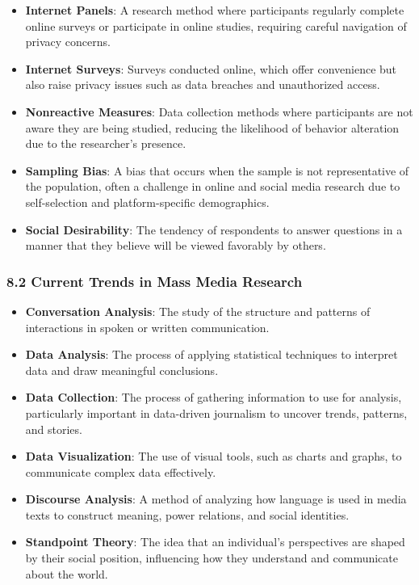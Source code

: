 \documentclass[
]{book}
\providecommand{\tightlist}{%
  \setlength{\itemsep}{0pt}\setlength{\parskip}{0pt}}
\begin{document}
\begin{itemize}
\tightlist
\item
  \textbf{Internet Panels}: A research method where participants regularly complete online surveys or participate in online studies, requiring careful navigation of privacy concerns.
\item
  \textbf{Internet Surveys}: Surveys conducted online, which offer convenience but also raise privacy issues such as data breaches and unauthorized access.
\item
  \textbf{Nonreactive Measures}: Data collection methods where participants are not aware they are being studied, reducing the likelihood of behavior alteration due to the researcher's presence.
\item
  \textbf{Sampling Bias}: A bias that occurs when the sample is not representative of the population, often a challenge in online and social media research due to self-selection and platform-specific demographics.
\item
  \textbf{Social Desirability}: The tendency of respondents to answer questions in a manner that they believe will be viewed favorably by others.
\end{itemize}

\subsubsection*{\texorpdfstring{\textbf{8.2 Current Trends in Mass Media Research}}{8.2 Current Trends in Mass Media Research}}\label{current-trends-in-mass-media-research-1}

\begin{itemize}
\tightlist
\item
  \textbf{Conversation Analysis}: The study of the structure and patterns of interactions in spoken or written communication.
\item
  \textbf{Data Analysis}: The process of applying statistical techniques to interpret data and draw meaningful conclusions.
\item
  \textbf{Data Collection}: The process of gathering information to use for analysis, particularly important in data-driven journalism to uncover trends, patterns, and stories.
\item
  \textbf{Data Visualization}: The use of visual tools, such as charts and graphs, to communicate complex data effectively.
\item
  \textbf{Discourse Analysis}: A method of analyzing how language is used in media texts to construct meaning, power relations, and social identities.
\item
  \textbf{Standpoint Theory}: The idea that an individual's perspectives are shaped by their social position, influencing how they understand and communicate about the world.
\end{itemize}
\end{document}

